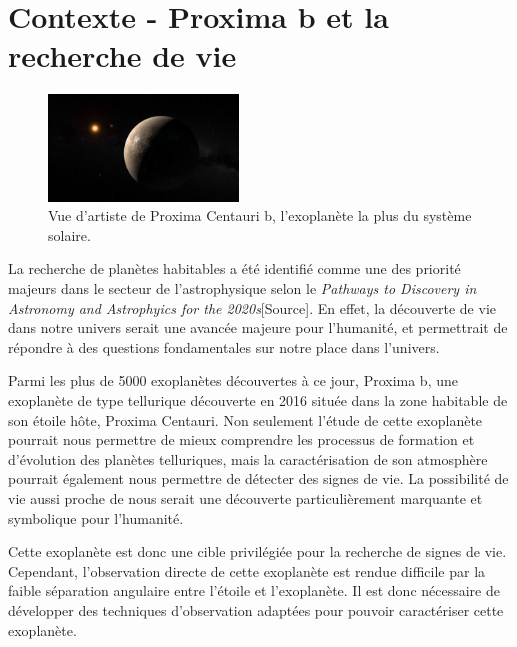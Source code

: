 
\section{Contexte - Proxima b et la recherche de vie}

\begin{figure}
    \includegraphics[width=0.45\textwidth]{figures/art_proxb.jpg}
    \caption{Vue d'artiste de Proxima Centauri b, l'exoplanète la plus du système solaire.}
\end{figure}

La recherche de planètes habitables a été identifié comme une des priorité majeurs dans le secteur de l'astrophysique selon le \textsl{Pathways to Discovery in Astronomy and Astrophyics for the 2020s}[Source]. En effet, la découverte de vie dans notre univers serait une avancée majeure pour l'humanité, et permettrait de répondre à des questions fondamentales sur notre place dans l'univers. 

Parmi les plus de 5000 exoplanètes découvertes à ce jour, Proxima b, une exoplanète de type tellurique découverte en 2016 située dans la zone habitable de son étoile hôte, Proxima Centauri. Non seulement l'étude de cette exoplanète pourrait nous permettre de mieux comprendre les processus de formation et d'évolution des planètes telluriques, mais la caractérisation de son atmosphère pourrait également nous permettre de détecter des signes de vie. La possibilité de vie aussi proche de nous serait une découverte particulièrement marquante et symbolique pour l'humanité.

Cette exoplanète est donc une cible privilégiée pour la recherche de signes de vie. Cependant, l'observation directe de cette exoplanète est rendue difficile par la faible séparation angulaire entre l'étoile et l'exoplanète. Il est donc nécessaire de développer des techniques d'observation adaptées pour pouvoir caractériser cette exoplanète.

